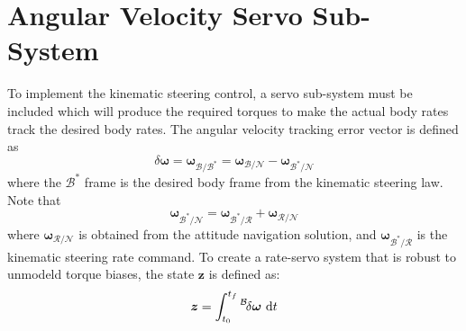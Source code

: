 \documentclass[]{AVSSimReportMemo}
\begin{document}
\section{Angular Velocity Servo Sub-System}
To implement the kinematic steering control, a servo sub-system must be included which will produce the required torques to make the actual body rates track the desired body rates.  The angular velocity tracking error vector is defined as
\begin{equation}
	\label{eq:MS:32}
	\delta \bm \omega = \bm\omega_{\mathcal{B}/\mathcal{B}^{\ast}} = \bm\omega_{\mathcal{B}/\mathcal{N}} - \bm\omega_{\mathcal{B}^{\ast}/\mathcal{N}}
\end{equation}
where the $\mathcal{B}^{\ast}$ frame is the desired body frame from the kinematic steering law.  Note that
\begin{equation}
	 \bm\omega_{\mathcal{B}^{\ast}/\mathcal{N}} =  \bm\omega_{\mathcal{B}^{\ast}/\mathcal{R}} +  \bm\omega_{\mathcal{R}/\mathcal{N}}
\end{equation}
where $\bm\omega_{\mathcal{R}/\mathcal{N}}$ is obtained from the attitude navigation solution, and $ \bm\omega_{\mathcal{B}^{\ast}/\mathcal{R}}$ is the kinematic steering rate command.  To create a rate-servo system that is robust to unmodeld torque biases, the state $\bm z$ is defined as:
\begin{equation}
	\label{eq:MS:34}
	\bm z = \int_{t_{0}}^{t_{f}} \leftexp{B}{ \delta\bm\omega}\ \D t
\end{equation}
\end{document}
